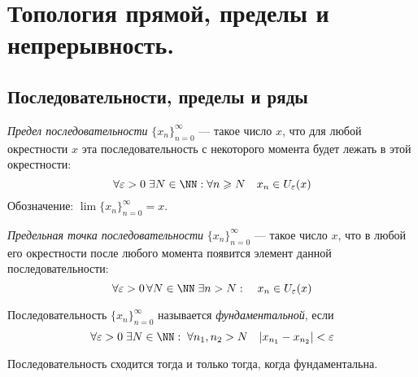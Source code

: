 \documentclass[12pt,a4paper]{article}
\begin{document}
    \section{Топология прямой, пределы и непрерывность.}

    \subsection{Последовательности, пределы и ряды}

    \begin{definition}
        \emph{Предел последовательности} $\{x_n\}_{n=0}^\infty$ --- такое число $x$, что для любой окрестности $x$ эта последовательность с некоторого момента будет лежать в этой окрестности:
        \[\forall \varepsilon > 0\; \exists N \in \NN: \forall n \geqslant N\quad x_n \in U_\varepsilon(x)\]
        Обозначение: $\lim \{x_n\}_{n=0}^\infty = x$.

        \emph{Предельная точка последовательности} $\{x_n\}_{n=0}^\infty$ --- такое число $x$, что в любой его окрестности после любого момента появится элемент данной последовательности:
        \[\forall \varepsilon > 0\, \forall N \in \NN\; \exists n > N: \quad x_n \in U_\varepsilon(x)\]
    \end{definition}

    \begin{definition}
        Последовательность $\{x_n\}_{n=0}^\infty$ называется \emph{фундаментальной}, если
        \[\forall \varepsilon > 0\; \exists N \in \NN:\; \forall n_1, n_2 > N\quad |x_{n_1} - x_{n_2}| < \varepsilon\]
    \end{definition}

    \begin{theorem}\label{fundamental_seq_theorem}
        Последовательность сходится тогда и только тогда, когда фундаментальна.
    \end{theorem}
\end{document}
